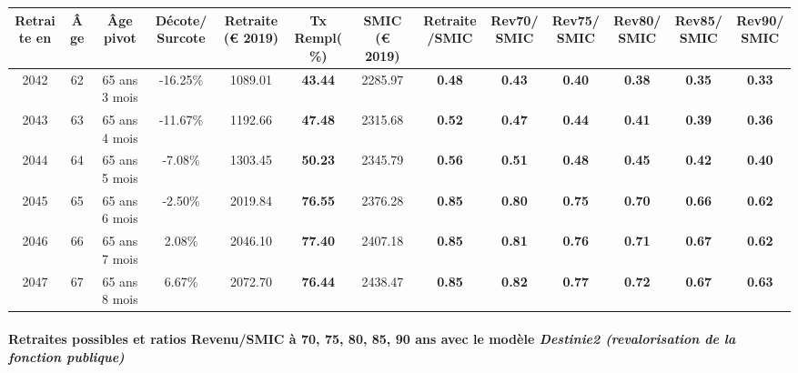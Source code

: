 { \scriptsize \begin{center} 
\begin{tabular}[htb]{|c|c||c|c||c|c||c||c|c|c|c|c|c|} 
\hline 
 Retraite en &  Âge &  Âge pivot &  Décote/Surcote &  Retraite (\euro{} 2019) &  Tx Rempl(\%) &  SMIC (\euro{} 2019) &  Retraite/SMIC &  Rev70/SMIC &  Rev75/SMIC &  Rev80/SMIC &  Rev85/SMIC &  Rev90/SMIC \\ 
\hline \hline 
 2042 &  62 &  65 ans 3 mois &  -16.25\% &  1089.01 &  {\bf 43.44} &  2285.97 &  {\bf {\color{red} 0.48}} &  {\bf {\color{red} 0.43}} &  {\bf {\color{red} 0.40}} &  {\bf {\color{red} 0.38}} &  {\bf {\color{red} 0.35}} &  {\bf {\color{red} 0.33}} \\ 
\hline 
 2043 &  63 &  65 ans 4 mois &  -11.67\% &  1192.66 &  {\bf 47.48} &  2315.68 &  {\bf {\color{red} 0.52}} &  {\bf {\color{red} 0.47}} &  {\bf {\color{red} 0.44}} &  {\bf {\color{red} 0.41}} &  {\bf {\color{red} 0.39}} &  {\bf {\color{red} 0.36}} \\ 
\hline 
 2044 &  64 &  65 ans 5 mois &  -7.08\% &  1303.45 &  {\bf 50.23} &  2345.79 &  {\bf {\color{red} 0.56}} &  {\bf {\color{red} 0.51}} &  {\bf {\color{red} 0.48}} &  {\bf {\color{red} 0.45}} &  {\bf {\color{red} 0.42}} &  {\bf {\color{red} 0.40}} \\ 
\hline 
 2045 &  65 &  65 ans 6 mois &  -2.50\% &  2019.84 &  {\bf 76.55} &  2376.28 &  {\bf {\color{red} 0.85}} &  {\bf {\color{red} 0.80}} &  {\bf {\color{red} 0.75}} &  {\bf {\color{red} 0.70}} &  {\bf {\color{red} 0.66}} &  {\bf {\color{red} 0.62}} \\ 
\hline 
 2046 &  66 &  65 ans 7 mois &  2.08\% &  2046.10 &  {\bf 77.40} &  2407.18 &  {\bf {\color{red} 0.85}} &  {\bf {\color{red} 0.81}} &  {\bf {\color{red} 0.76}} &  {\bf {\color{red} 0.71}} &  {\bf {\color{red} 0.67}} &  {\bf {\color{red} 0.62}} \\ 
\hline 
 2047 &  67 &  65 ans 8 mois &  6.67\% &  2072.70 &  {\bf 76.44} &  2438.47 &  {\bf {\color{red} 0.85}} &  {\bf {\color{red} 0.82}} &  {\bf {\color{red} 0.77}} &  {\bf {\color{red} 0.72}} &  {\bf {\color{red} 0.67}} &  {\bf {\color{red} 0.63}} \\ 
\hline 
\hline 
\end{tabular} 
\end{center} } 
\paragraph{Retraites possibles et ratios Revenu/SMIC à 70, 75, 80, 85, 90 ans avec le modèle \emph{Destinie2 (revalorisation de la fonction publique)}}  
 
